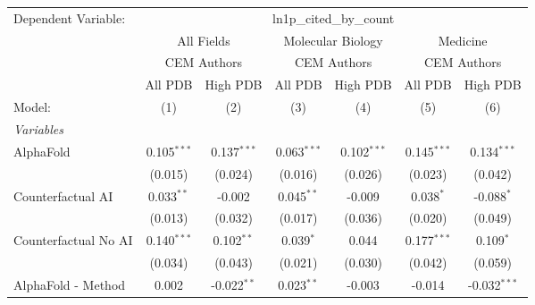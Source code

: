 \begingroup
\centering
\begin{tabular}{lcccccc}
   \tabularnewline \midrule \midrule
   Dependent Variable: & \multicolumn{6}{c}{ln1p\_cited\_by\_count}\\
 & \multicolumn{2}{c}{All Fields} & \multicolumn{2}{c}{Molecular Biology} & \multicolumn{2}{c}{Medicine} \\
\cmidrule(lr){2-3} \cmidrule(lr){4-5} \cmidrule(lr){6-7}
 & \multicolumn{2}{c}{CEM Authors} & \multicolumn{2}{c}{CEM Authors} & \multicolumn{2}{c}{CEM Authors} \\
\cmidrule(lr){2-3} \cmidrule(lr){4-5} \cmidrule(lr){6-7}
 & \multicolumn{1}{c}{All PDB} & \multicolumn{1}{c}{High PDB} & \multicolumn{1}{c}{All PDB} & \multicolumn{1}{c}{High PDB} & \multicolumn{1}{c}{All PDB} & \multicolumn{1}{c}{High PDB} \\
\cmidrule(lr){2-2} \cmidrule(lr){3-3} \cmidrule(lr){4-4} \cmidrule(lr){5-5} \cmidrule(lr){6-6} \cmidrule(lr){7-7}
   Model:                                                     & (1)           & (2)           & (3)           & (4)           & (5)           & (6)\\  
   \midrule
   \emph{Variables}\\
   AlphaFold                                                  & 0.105$^{***}$ & 0.137$^{***}$ & 0.063$^{***}$ & 0.102$^{***}$ & 0.145$^{***}$ & 0.134$^{***}$\\   
                                                              & (0.015)       & (0.024)       & (0.016)       & (0.026)       & (0.023)       & (0.042)\\   
   Counterfactual AI                                          & 0.033$^{**}$  & -0.002        & 0.045$^{**}$  & -0.009        & 0.038$^{*}$   & -0.088$^{*}$\\   
                                                              & (0.013)       & (0.032)       & (0.017)       & (0.036)       & (0.020)       & (0.049)\\   
   Counterfactual No AI                                       & 0.140$^{***}$ & 0.102$^{**}$  & 0.039$^{*}$   & 0.044         & 0.177$^{***}$ & 0.109$^{*}$\\   
                                                              & (0.034)       & (0.043)       & (0.021)       & (0.030)       & (0.042)       & (0.059)\\   
   AlphaFold - Method                                         & 0.002         & -0.022$^{**}$ & 0.023$^{**}$  & -0.003        & -0.014        & -0.032$^{***}$\\   

\end{tabular}
